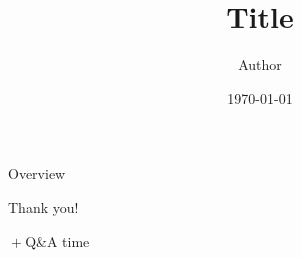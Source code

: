 \documentclass[aspectratio=169]{beamer}
\title{Title}
\author{Author}
\date{\today}
\begin{document}
\begin{frame}
  \titlepage
\end{frame}

\begin{frame}{Overview}
  \tableofcontents
\end{frame}



\begin{frame}
    \begin{center}
        \Huge{Thank you!}

        \Large{\({}+{}\)Q\&A time}
    \end{center}    
\end{frame}
\end{document}
